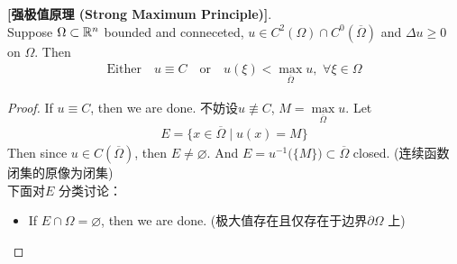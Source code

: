 	\begin{thm}\label{thm 3.4.4}
		\textbf{[强极值原理 (Strong Maximum Principle)]}. \\
		Suppose $\Omega \subset \mathbb{R}^n$ bounded and conneceted, $u \in C^2(\Omega) \cap C^0 \left( \overline{\Omega} \right)$ and $\Delta u \geq 0$ on $\Omega$. Then
		\begin{align*}
			\text{Either} \hspace{1em} u \equiv C \hspace{1em} \text{or} \hspace{1em} u(\xi) < \max_{\overline{\Omega}} u , \,\, \forall \xi \in \Omega
		\end{align*}
		
		\vspace{4em}
		
		\begin{proof}
			If $u \equiv C$, then we are done. 不妨设$u \not\equiv C$, $M = \underset{\overline{\Omega}}{\max} u$. Let
			\begin{align*}
				E = \Big\{ x \in \overline{\Omega} \mid u(x) = M \Big\}
			\end{align*}
			Then since $u \in C\left( \overline{\Omega} \right)$, then $E \neq \varnothing$. And $E = u^{-1}\Big( \{ M \} \Big) \subset \overline{\Omega}$ closed. (连续函数闭集的原像为闭集) \\
			下面对$E$ 分类讨论：
			
			\vspace{1em}
			
			\begin{itemize}
				\item If $E \cap \Omega = \varnothing$, then we are done. (极大值存在且仅存在于边界$\partial \Omega$ 上)
				
				\vspace{2em}
				

\end{itemize}
\end{proof}
\end{thm}
